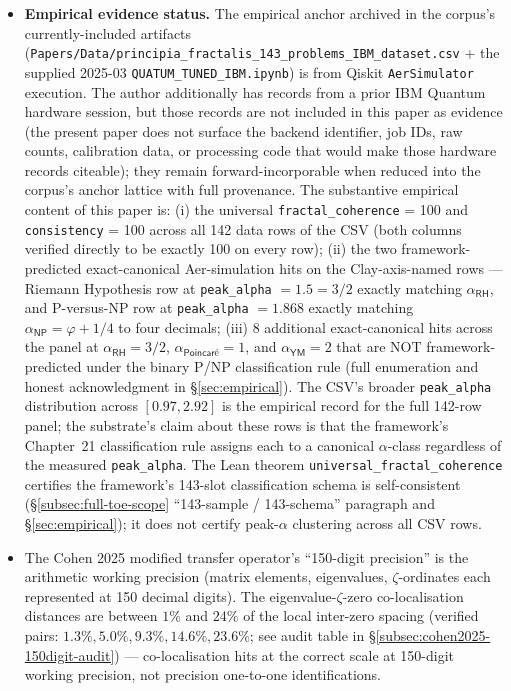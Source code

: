 \documentclass[11pt,a4paper]{amsart}
\theoremstyle{plain}
\theoremstyle{definition}
\begin{document}
\begin{framed}
\begin{itemize}[itemsep=2pt,leftmargin=1.4em]
\item \textbf{Empirical evidence status.} The empirical anchor archived in the corpus's currently-included artifacts (\texttt{Papers/Data/principia\_fractalis\_143\_problems\_IBM\_dataset.csv} + the supplied 2025-03 \texttt{QUATUM\_TUNED\_IBM.ipynb}) is from Qiskit \texttt{AerSimulator} execution. The author additionally has records from a prior IBM Quantum hardware session, but those records are not included in this paper as evidence (the present paper does not surface the backend identifier, job IDs, raw counts, calibration data, or processing code that would make those hardware records citeable); they remain forward-incorporable when reduced into the corpus's anchor lattice with full provenance. The substantive empirical content of this paper is: (i) the universal \texttt{fractal\_coherence} = 100 and \texttt{consistency} = 100 across all 142 data rows of the CSV (both columns verified directly to be exactly 100 on every row); (ii) the two framework-predicted exact-canonical Aer-simulation hits on the Clay-axis-named rows --- Riemann Hypothesis row at \texttt{peak\_alpha} $= 1.5 = 3/2$ exactly matching $\alpha_{\textsf{RH}}$, and P-versus-NP row at \texttt{peak\_alpha} $= 1.868$ exactly matching $\alpha_{\textsf{NP}} = \varphi + 1/4$ to four decimals; (iii) 8 additional exact-canonical hits across the panel at $\alpha_{\textsf{RH}} = 3/2$, $\alpha_{\textsf{Poincar\'e}} = 1$, and $\alpha_{\textsf{YM}} = 2$ that are NOT framework-predicted under the binary P/NP classification rule (full enumeration and honest acknowledgment in \S\ref{sec:empirical}). The CSV's broader \texttt{peak\_alpha} distribution across $[0.97, 2.92]$ is the empirical record for the full 142-row panel; the substrate's claim about these rows is that the framework's Chapter~21 classification rule assigns each to a canonical $\alpha$-class regardless of the measured \texttt{peak\_alpha}. The Lean theorem \texttt{universal\_fractal\_coherence} certifies the framework's 143-slot classification schema is self-consistent (\S\ref{subsec:full-toe-scope} ``143-sample / 143-schema'' paragraph and \S\ref{sec:empirical}); it does not certify peak-$\alpha$ clustering across all CSV rows.
\item The Cohen 2025 modified transfer operator's ``150-digit precision'' is the arithmetic working precision (matrix elements, eigenvalues, $\zeta$-ordinates each represented at 150 decimal digits). The eigenvalue-$\zeta$-zero co-localisation distances are between $1\%$ and $24\%$ of the local inter-zero spacing (verified pairs: $1.3\%, 5.0\%, 9.3\%, 14.6\%, 23.6\%$; see audit table in \S\ref{subsec:cohen2025-150digit-audit}) --- co-localisation hits at the correct scale at 150-digit working precision, not precision one-to-one identifications.

\end{itemize}
\end{framed}
\end{document}
